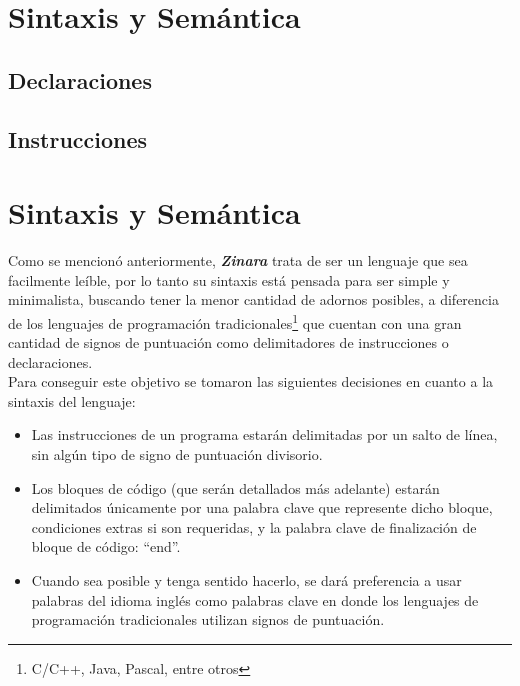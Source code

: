 \documentclass[12pt, spanish]{report}
\begin{document}
\section{Sintaxis y Sem\'antica}
\label{sec:synsem}

\subsection{Declaraciones}
\label{sec:decl}

\subsection{Instrucciones}
\label{sec:instr}

\section{Sintaxis y Sem\'antica}
\label{sec:synsem}

Como se mencion\'o anteriormente, \emph{\textbf{Zinara}} trata de ser un
lenguaje que sea facilmente le\'ible, por lo tanto su sintaxis est\'a
pensada para ser simple y minimalista, buscando tener la menor
cantidad de adornos posibles, a diferencia de los lenguajes de
programaci\'on tradicionales\footnote{C/C++, Java, Pascal, entre otros}
que cuentan con una gran cantidad de signos de puntuaci\'on como
delimitadores de instrucciones o declaraciones.\\

Para conseguir este objetivo se tomaron las siguientes decisiones en
cuanto a la sintaxis del lenguaje:

\begin{itemize}
\item Las instrucciones de un programa estar\'an delimitadas por un
 salto de l\'inea, sin alg\'un tipo de signo de puntuaci\'on divisorio.

\item Los bloques de c\'odigo (que ser\'an detallados m\'as adelante)
 estar\'an delimitados \'unicamente por una palabra clave que represente
 dicho bloque, condiciones extras si son requeridas, y la palabra
 clave de finalizaci\'on de bloque de c\'odigo: ``end''.

\item Cuando sea posible y tenga sentido hacerlo, se dar\'a preferencia
 a usar palabras del idioma ingl\'es como palabras clave en donde los
 lenguajes de programaci\'on tradicionales utilizan signos de
 puntuaci\'on.
\end{itemize}
\end{document}
